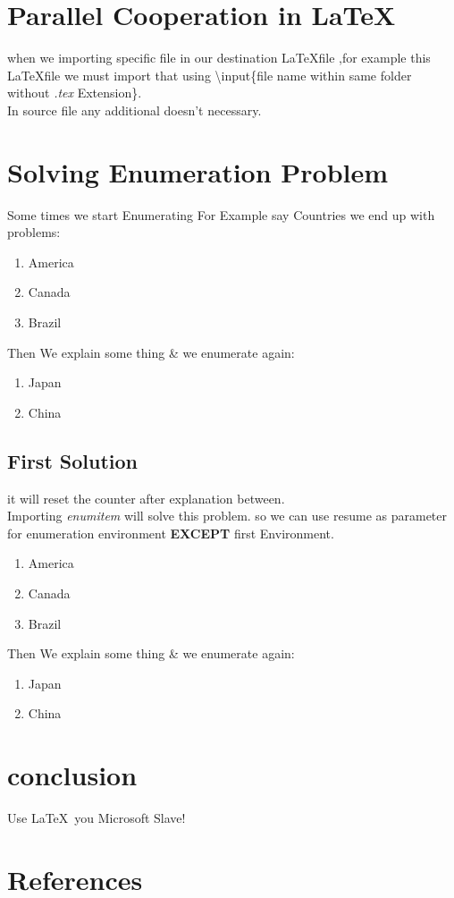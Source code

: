 \documentclass{article}
\begin{document}
	\section{Parallel Cooperation in \LaTeX}
		when we importing specific file in our destination \LaTeX file ,for example this \LaTeX file we must import that using \textbackslash input\{file name within same folder without \emph{.tex} Extension\}.\\
		In source file any additional doesn't necessary.
	\section{Solving Enumeration Problem}
		Some times we start Enumerating For Example say Countries we end up with problems:
		\begin{enumerate}
			\item America
			\item Canada
			\item Brazil
		\end{enumerate}
		Then We explain some thing \& we enumerate again:
		\begin{enumerate}
			\item Japan
			\item China
		\end{enumerate}
		\subsection{First Solution}
			it will reset the counter after explanation between.\\
			Importing \emph{enumitem} will solve this problem. so we can use resume as parameter for enumeration environment \textbf{EXCEPT} first Environment.
			\begin{enumerate}
				\item America
				\item Canada
				\item Brazil
			\end{enumerate}
			Then We explain some thing \& we enumerate again:
			\begin{enumerate}[resume]
				\item Japan
				\item China
			\end{enumerate}
	\section{conclusion}
		Use \LaTeX \, you Microsoft Slave!
	\section{References}
	
\end{document}
